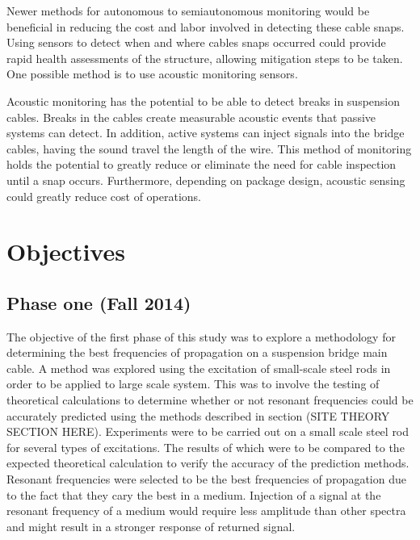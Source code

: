 Newer methods for autonomous to semiautonomous monitoring would be beneficial in reducing the cost and labor involved in detecting these cable snaps.  Using sensors to detect when and where cables snaps occurred could provide rapid health assessments of the structure, allowing mitigation steps to be taken.  One possible method is to use acoustic monitoring sensors.  

Acoustic monitoring has the potential to be able to detect breaks in suspension cables.  Breaks in the cables create measurable acoustic events that passive systems can detect.  In addition, active systems can inject signals into the bridge cables, having the sound travel the length of the wire.  This method of monitoring holds the potential to greatly reduce or eliminate the need for cable inspection until a snap occurs.  Furthermore, depending on package design, acoustic sensing could greatly reduce cost of operations.


\section{Objectives}

\subsection{Phase one (Fall 2014)}

The objective of the first phase of this study was to explore a methodology for determining the best frequencies of propagation on a suspension bridge main cable. A method was explored using the excitation of small-scale steel rods in order to be applied to large scale system. This was to involve the testing of theoretical calculations to determine whether or not resonant frequencies could be accurately predicted using the methods described in section (SITE THEORY SECTION HERE). Experiments were to be carried out on a small scale steel rod for several types of excitations. The results of which were to be compared to the expected theoretical calculation to verify the accuracy of the prediction methods. Resonant frequencies were selected to be the best frequencies of propagation due to the fact that they cary the best in a medium. Injection of a signal at the resonant frequency of a medium would require less amplitude than other spectra and might result in a stronger response of returned signal. 

